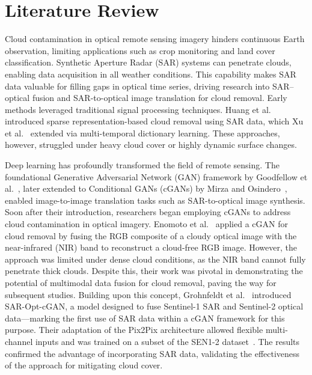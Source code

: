 \chapter{Literature Review}
\label{chapter:literature}
Cloud contamination in optical remote sensing imagery hinders continuous Earth observation, limiting applications such as crop monitoring and land cover classification. Synthetic Aperture Radar (SAR) systems can penetrate clouds, enabling data acquisition in all weather conditions. This capability makes SAR data valuable for filling gaps in optical time series, driving research into SAR–optical fusion and SAR-to-optical image translation for cloud removal.
Early methods leveraged traditional signal processing techniques. Huang et al.~\cite{huang2015} introduced sparse representation-based cloud removal using SAR data, which Xu et al.~\cite{CR_spars_repre_MT_dict_L} extended via multi-temporal dictionary learning. These approaches, however, struggled under heavy cloud cover or highly dynamic surface changes. 

Deep learning has profoundly transformed the field of remote sensing. The foundational Generative Adversarial Network (GAN) framework by Goodfellow et al.~\cite{GANs_Goodfellow}, later extended to Conditional GANs (cGANs) by Mirza and Osindero~\cite{cGANs_mirza}, enabled image-to-image translation tasks such as SAR-to-optical image synthesis. Soon after their introduction, researchers began employing cGANs to address cloud contamination in optical imagery. 
Enomoto et al.~\cite{filmy_cloudy_NIR_Enomoto} applied a cGAN for cloud removal by fusing the RGB composite of a cloudy optical image with the near-infrared (NIR) band to reconstruct a cloud-free RGB image. However, the approach was limited under dense cloud conditions, as the NIR band cannot fully penetrate thick clouds. Despite this, their work was pivotal in demonstrating the potential of multimodal data fusion for cloud removal, paving the way for subsequent studies.
Building upon this concept, Grohnfeldt et al.~\cite{A_cGAN_fuse_sar_MS_CR} introduced SAR-Opt-cGAN, a model designed to fuse Sentinel-1 SAR and Sentinel-2 optical data—marking the first use of SAR data within a cGAN framework for this purpose. Their adaptation of the Pix2Pix architecture allowed flexible multi-channel inputs and was trained on a subset of the SEN1-2 dataset~\cite{sen12_2018}. The results confirmed the advantage of incorporating SAR data, validating the effectiveness of the approach for mitigating cloud cover.

